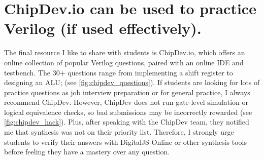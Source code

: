 \section{ChipDev.io can be used to practice Verilog (if used effectively).}




The final resource I like to share with students is ChipDev.io, which offers an online collection of popular Verilog questions, paired with an online IDE and testbench.
The 30+ questions range from implementing a shift register to designing an ALU; (see \autoref{fig:chipdev_questions}).
If students are looking for lots of practice questions as job interview preparation or for general practice, I always recommend ChipDev.
However, ChipDev does not run gate-level simulation or logical equivalence checks, so bad submissions may be incorrectly rewarded (see \autoref{fig:chipdev_hack}).
Plus, after speaking with the ChipDev team, they notified me that synthesis was not on their priority list.
Therefore, I strongly urge students to verify their answers with DigitalJS Online or other synthesis tools before feeling they have a mastery over any question.
